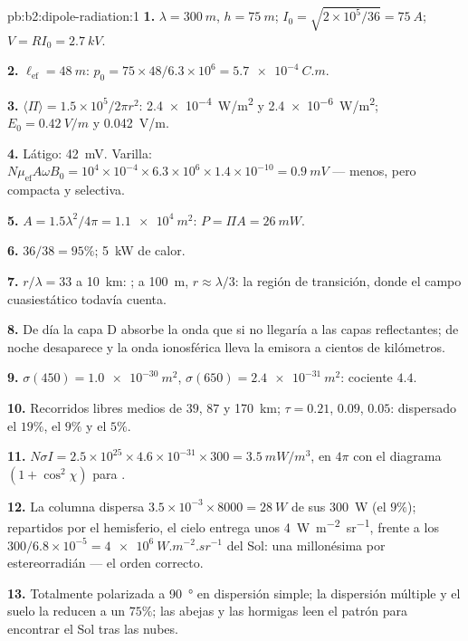 \begin{solution}{pb:b2:dipole-radiation:1}
\textbf{1.} $\lambda = \qty{300}{m}$, $h = \qty{75}{m}$; $I_0 = \sqrt{2 \times 10^5/36} = \qty{75}{A}$;
$V = RI_0 = \qty{2.7}{kV}$.

\textbf{2.} $\ell_{\text{ef}} = \qty{48}{m}$: $p_0 = 75 \times 48/6.3 \times 10^6 = \qty{5.7e-4}{C.m}$.

\textbf{3.} $\langle\Pi\rangle = 1.5 \times 10^5/2\pi r^2$: \qty{2.4e-4}{W/m^2} y \qty{2.4e-6}{W/m^2};
$E_0 = \qty{0.42}{V/m}$ y \qty{0.042}{V/m}.

\textbf{4.} Látigo: \qty{42}{mV}. Varilla: $N\mu_{\text{ef}}A\omega B_0 = 10^4 \times 10^{-4} \times 6.3 \times
10^6 \times 1.4 \times 10^{-10} = \qty{0.9}{mV}$ --- menos, pero compacta y selectiva.

\textbf{5.} $A = 1.5\lambda^2/4\pi = \qty{1.1e4}{m^2}$: $P = \Pi A = \qty{26}{mW}$.

\textbf{6.} $36/38 = 95\%$; \qty{5}{kW} de calor.

\textbf{7.} $r/\lambda = 33$ a \qty{10}{km}: ; a \qty{100}{m},
$r \approx \lambda/3$: la región de transición, donde el campo cuasiestático todavía
cuenta.

\textbf{8.} De día la capa D absorbe la onda que si no llegaría
a las capas reflectantes; de noche desaparece y la onda ionosférica
lleva la emisora a cientos de kilómetros.

\textbf{9.} $\sigma(450) = \qty{1.0e-30}{m^2}$, $\sigma(650) = \qty{2.4e-31}{m^2}$: cociente $4.4$.

\textbf{10.} Recorridos libres medios de $39$, $87$ y \qty{170}{km}; $\tau = 0.21$, $0.09$, $0.05$:
dispersado el $19\%$, el $9\%$ y el $5\%$.

\textbf{11.} $N\sigma I = 2.5 \times 10^{25} \times 4.6 \times 10^{-31} \times 300 = \qty{3.5}{mW/m^3}$,
en $4\pi$ con el diagrama $(1 + \cos^2\chi)$ para .

\textbf{12.} La columna dispersa $3.5 \times 10^{-3} \times 8000 = \qty{28}{W}$ de sus
\qty{300}{W} (el $9\%$); repartidos por el hemisferio, el cielo entrega unos
\qty{4}{W.m^{-2}.sr^{-1}}, frente a los $300/6.8 \times 10^{-5} = \qty{4e6}{W.m^{-2}.sr^{-1}}$ del Sol:
una millonésima por estereorradián --- el orden correcto.

\textbf{13.} Totalmente polarizada a \qty{90}{\degree} en dispersión simple; la dispersión
múltiple y el suelo la reducen a un $75\%$; las abejas y las hormigas leen
el patrón para encontrar el Sol tras las nubes.


\end{solution}
